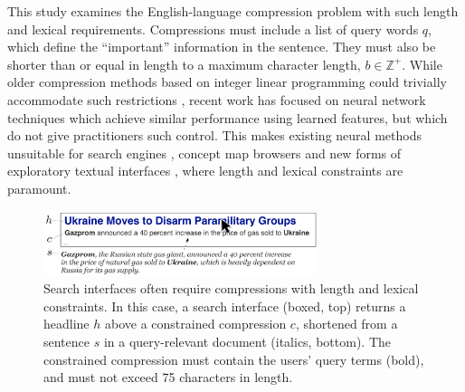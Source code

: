 \documentclass[11pt,a4paper]{article}
\begin{document}
This study examines the English-language compression problem with such length and lexical requirements. Compressions must include a list of query words $q$, which define the ``important'' information in the sentence. They must also be shorter than or equal in length to a maximum character length, $b \in \mathbb{Z}^{+}$. While older compression methods based on integer linear programming could trivially accommodate such restrictions \cite{clarke2008global,filippova2013overcoming}, recent work has focused on neural network techniques \cite{filippova2015sentence} which achieve similar performance using learned features, but which do not give practitioners such control. This makes existing neural methods unsuitable for search engines \cite{hearst2009search}, concept map browsers \cite{falke2017graphdocexplore} and new forms of exploratory textual interfaces \cite{marchionini2006exploratory}, where length and lexical constraints are paramount. 

\begin{figure}[htb!]
\includegraphics[width=8cm]{qf.pdf}
\caption{Search interfaces often require compressions with length and lexical constraints. In this case, a search interface (boxed, top) returns a headline $h$ above a constrained compression $c$, shortened from a sentence $s$ in a query-relevant document (italics, bottom). The constrained compression must contain the users' query terms (bold), and must not exceed 75 characters in length.}
\label{f:qf}
\end{figure}
\end{document}
